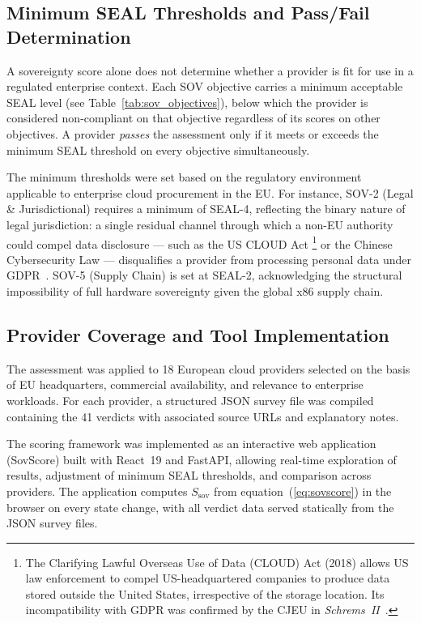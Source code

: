 \subsection{Minimum SEAL Thresholds and Pass/Fail Determination}
\label{subsec:min_seal}

A sovereignty score alone does not determine whether a provider is fit for use in a regulated enterprise context. Each SOV objective carries a minimum acceptable SEAL level (see Table~\ref{tab:sov_objectives}), below which the provider is considered non-compliant on that objective regardless of its scores on other objectives. A provider \textit{passes} the assessment only if it meets or exceeds the minimum SEAL threshold on every objective simultaneously.

The minimum thresholds were set based on the regulatory environment applicable to enterprise cloud procurement in the EU. For instance, SOV-2 (Legal \& Jurisdictional) requires a minimum of SEAL-4, reflecting the binary nature of legal jurisdiction: a single residual channel through which a non-EU authority could compel data disclosure — such as the US CLOUD Act%
\footnote{The Clarifying Lawful Overseas Use of Data (CLOUD) Act (2018) allows US law enforcement to compel US-headquartered companies to produce data stored outside the United States, irrespective of the storage location. Its incompatibility with GDPR was confirmed by the CJEU in \textit{Schrems~II}~\cite{SchremsII_2020}.}
or the Chinese Cybersecurity Law — disqualifies a provider from processing personal data under GDPR~\cite{GDPR2016}. SOV-5 (Supply Chain) is set at SEAL-2, acknowledging the structural impossibility of full hardware sovereignty given the global x86 supply chain.

\subsection{Provider Coverage and Tool Implementation}
\label{subsec:sovscore_implementation}

The assessment was applied to 18 European cloud providers selected on the basis of EU headquarters, commercial availability, and relevance to enterprise workloads. For each provider, a structured JSON survey file was compiled containing the 41 verdicts with associated source URLs and explanatory notes.

The scoring framework was implemented as an interactive web application (SovScore) built with React~19 and FastAPI, allowing real-time exploration of results, adjustment of minimum SEAL thresholds, and comparison across providers. The application computes $S_{\text{sov}}$ from equation~(\ref{eq:sovscore}) in the browser on every state change, with all verdict data served statically from the JSON survey files.

